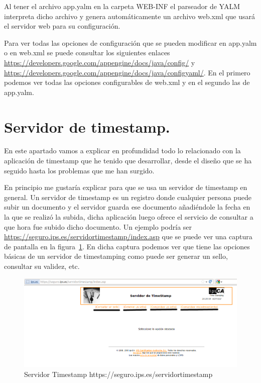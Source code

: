 Al tener el archivo app.yalm en la carpeta WEB-INF el parseador de YALM  interpreta dicho archivo y genera automáticamente un archivo web.xml que usará el servidor web para su configuración.

Para ver todas las opciones de configuración que se pueden modificar en app.yalm o en web.xml se puede consultar los siguientes enlaces \url{https://developers.google.com/appengine/docs/java/config/} y \url{https://developers.google.com/appengine/docs/java/configyaml/}. En el primero podemos ver todas las opciones configurables de web.xml y en el segundo las de app.yalm.




\section{Servidor de timestamp.}

En este apartado vamos a explicar en profundidad todo lo relacionado con la aplicación de timestamp que he tenido que desarrollar, desde el diseño que se ha seguido hasta los problemas que me han surgido.

En principio me gustaría explicar para que se usa un servidor de timestamp en general. Un servidor de timestamp es un registro donde cualquier persona puede subir un documento y el servidor guarda ese documento añadiéndole la fecha en la que se realizó la subida, dicha aplicación luego ofrece el servicio de consultar a que hora fue subido dicho documento. Un ejemplo podría ser \url{https://seguro.ips.es/servidortimestamp/index.asp} que se puede ver una captura de pantalla en la figura~\ref{fig:server_ips_timestamp}. En dicha captura podemos ver que tiene las opciones básicas de un servidor de timestamping como puede ser generar un sello, consultar su validez, etc. 

\begin{figure}[h]
  \centering
    \includegraphics[scale=0.5]{./GoogleAppEngine/imagenes/server_ips_timestamp.png}
  \caption{Servidor Timestamp https://seguro.ips.es/servidortimestamp}
  \label{fig:server_ips_timestamp}
\end{figure}

